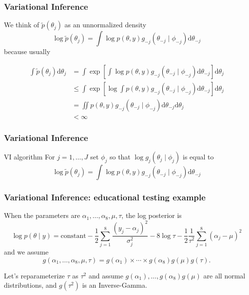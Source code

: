 \documentclass{beamer}
\begin{document}
\begin{frame}[fragile]
\frametitle{Variational Inference}

We think of $\tilde{p}(\theta_j)$ as an unnormalized density 
$$
\log\tilde{p}(\theta_j) = \int\log p(\theta, y)g_{-j}(\theta_{-j} \mid \phi_{-j}) \text{d}\theta_{-j}
$$
because usually

\begin{align*}
\int \tilde{p}(\theta_j) \text{d}\theta_j &= \int \exp\left[ \int\log p(\theta, y)g_{-j}(\theta_{-j} \mid \phi_{-j}) \text{d}\theta_{-j}\right] \text{d}\theta_j \\
&\le \int \exp\left[ \log \int p(\theta, y)g_{-j}(\theta_{-j} \mid \phi_{-j}) \text{d}\theta_{-j}\right] \text{d}\theta_j \tag{Jensen's}\\
&= \iint  p(\theta, y)g_{-j}(\theta_{-j} \mid \phi_{-j}) \text{d}\theta_{-j} \text{d}\theta_j \\
&< \infty
\end{align*}

\end{frame}

\begin{frame}[fragile]
\frametitle{Variational Inference}

\begin{block}{VI algorithm}
For $j=1,\ldots,J$ set $\phi_j$ so that $\log g_j(\theta_j \mid \phi_j)$ is equal to 
$$
\log\tilde{p}(\theta_j) = \int\log p(\theta, y)g_{-j}(\theta_{-j} \mid \phi_{-j}) \text{d}\theta_{-j}
$$
\end{block}

\end{frame}

\begin{frame}[fragile]
\frametitle{Variational Inference: educational testing example}

When the parameters are $\alpha_1, \ldots, \alpha_8, \mu, \tau$, the log posterior is
$$
\log p(\theta \mid y) = \text{constant} - \frac{1}{2}\sum_{j=1}^8\frac{(y_j - \alpha_j)^2 }{\sigma^2_j } - 8 \log \tau - \frac{1}{2}\frac{1}{\tau^2}\sum_{j=1}^8(\alpha_j - \mu)^2
$$
and we assume
$$
g(\alpha_1, \ldots, \alpha_8, \mu, \tau) = g(\alpha_1) \times  \cdots \times g(\alpha_8) g(\mu) g(\tau).
$$

Let's reparameterize $\tau$ as $\tau^2$ and assume $g(\alpha_1), \ldots, g(\alpha_8) g(\mu)$ are all normal distributions, and $g(\tau^2)$ is an Inverse-Gamma.

  
\end{frame}
\end{document}
